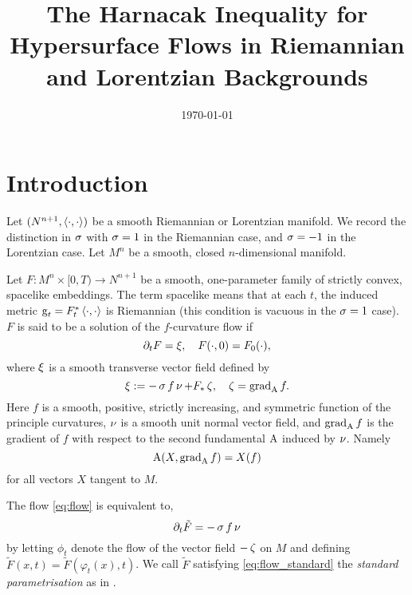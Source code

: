 \documentclass{amsart}
\begin{document}
\title[Hypersurface Harnack Inequality]
 {The Harnacak Inequality for Hypersurface Flows in Riemannian and Lorentzian Backgrounds}

\curraddr{}
\email{}
\date{\today}

\dedicatory{}
\subjclass[2010]{}
\keywords{}

\begin{abstract}

\end{abstract}

\maketitle

\section{Introduction}

Let $(N^{n+1},\bgg)$ be a smooth Riemannian or Lorentzian manifold. We record the distinction in \(\operatorname{\sigma}\) with \(\operatorname{\sigma} = 1\) in the Riemannian case, and \(\operatorname{\sigma} = -1\) in the Lorentzian case. Let $M^n$ be a smooth, closed $n$-dimensional manifold.

Let $F\colon M^n\times [0,T)\to N^{n+1}$ be a smooth, one-parameter family of strictly convex, spacelike embeddings. The term spacelike means that at each \(t\), the induced metric \(\g_t = F_t^{\ast} \bgg\) is Riemannian (this condition is vacuous in the \(\operatorname{\sigma} = 1\) case). \(F\) is said to be a solution of the $f$-curvature flow if
\begin{equation}
\label{eq:flow}
\partial_tF = \operatorname{\xi},\quad F(\cdot, 0) = F_0(\cdot),
\end{equation}
where $\operatorname{\xi} $ is a smooth transverse vector field defined by
\begin{equation}
\label{eq:transverse_vector}
\operatorname{\xi} := -\operatorname{\sigma} f\operatorname{\nu} + F_{\ast} \operatorname{\zeta}, \quad \operatorname{\zeta} = \operatorname{grad}_{\operatorname{A}} f.
\end{equation}
Here $f$ is a smooth, positive, strictly increasing, and symmetric function of the principle curvatures, $\operatorname{\nu}$ is a smooth unit normal vector field, and $\operatorname{grad}_{\operatorname{A}} f$ is the gradient of $f$ with respect to the second fundamental $\operatorname{A}$ induced by $\operatorname{\nu}$. Namely
\[
\operatorname{A}(X, \operatorname{grad}_{\operatorname{A}} f) = X(f)
\]
for all vectors $X$ tangent to $M$.

The flow \eqref{eq:flow} is equivalent to,
\begin{equation}
\label{eq:flow_standard}
\partial_t \tilde{F} = -\operatorname{\sigma} f \operatorname{\nu}
\end{equation}
by letting \(\phi_t\) denote the flow of the vector field \(-\operatorname{\zeta}\) on \(M\) and defining \(\tilde{F} (x, t) = \tilde{F}(\varphi_t(x), t)\). We call \(\tilde{F}\) satisfying \eqref{eq:flow_standard} the \emph{standard parametrisation} as in \cite{MR1296393}.
\end{document}
